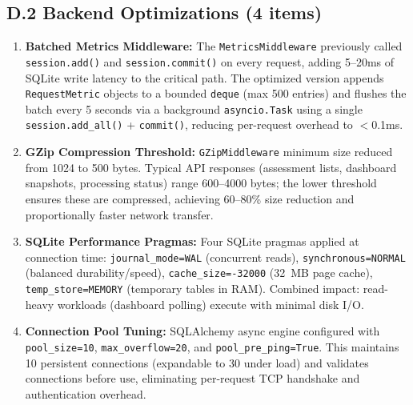 \documentclass[12pt]{article}
\begin{document}
	\subsection*{D.2 Backend Optimizations (4 items)}

	\begin{enumerate}
		\item \textbf{Batched Metrics Middleware:} The \texttt{MetricsMiddleware} previously called \texttt{session.add()} and \texttt{session.commit()} on every request, adding 5--20ms of SQLite write latency to the critical path. The optimized version appends \texttt{RequestMetric} objects to a bounded \texttt{deque} (max 500 entries) and flushes the batch every 5 seconds via a background \texttt{asyncio.Task} using a single \texttt{session.add\_all()} + \texttt{commit()}, reducing per-request overhead to $<$0.1ms.

		\item \textbf{GZip Compression Threshold:} \texttt{GZipMiddleware} minimum size reduced from 1024 to 500 bytes. Typical API responses (assessment lists, dashboard snapshots, processing status) range 600--4000 bytes; the lower threshold ensures these are compressed, achieving 60--80\% size reduction and proportionally faster network transfer.

		\item \textbf{SQLite Performance Pragmas:} Four SQLite pragmas applied at connection time: \texttt{journal\_mode=WAL} (concurrent reads), \texttt{synchronous=NORMAL} (balanced durability/speed), \texttt{cache\_size=-32000} (32~MB page cache), \texttt{temp\_store=MEMORY} (temporary tables in RAM). Combined impact: read-heavy workloads (dashboard polling) execute with minimal disk I/O.

		\item \textbf{Connection Pool Tuning:} SQLAlchemy async engine configured with \texttt{pool\_size=10}, \texttt{max\_overflow=20}, and \texttt{pool\_pre\_ping=True}. This maintains 10 persistent connections (expandable to 30 under load) and validates connections before use, eliminating per-request TCP handshake and authentication overhead.
	\end{enumerate}
\end{document}
